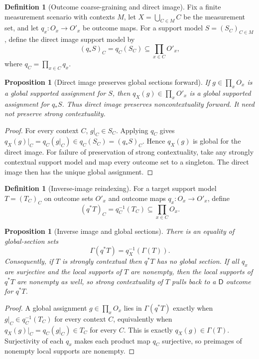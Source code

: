 \documentclass[11pt]{article}
\theoremstyle{plain}
\newtheorem{proposition}[theorem]{Proposition}
\theoremstyle{definition}
\newtheorem{definition}[theorem]{Definition}
\theoremstyle{remark}
\begin{document}
\begin{definition}[Outcome coarse-graining and direct image]
\label{def:empirical-direct-image}
Fix a finite measurement scenario with contexts $M$, let
$X=\bigcup_{C\in M}C$ be the measurement set, and let
$q_x:O_x\to O'_x$ be outcome maps. For a support model $S=(S_C)_{C\in M}$,
define the direct image support model by
\[
(q_*S)_C=q_C(S_C)\subseteq\prod_{x\in C}O'_x,
\]
where $q_C=\prod_{x\in C}q_x$.
\end{definition}

\begin{proposition}[Direct image preserves global sections forward]
\label{prop:empirical-direct-image}
If $g\in\prod_xO_x$ is a global supported assignment for $S$, then
$q_X(g)\in\prod_xO'_x$ is a global supported assignment for $q_*S$. Thus direct
image preserves noncontextuality forward. It need not preserve strong
contextuality.
\end{proposition}

\begin{proof}
For every context $C$, $g|_C\in S_C$. Applying $q_C$ gives
$q_X(g)|_C=q_C(g|_C)\in q_C(S_C)=(q_*S)_C$. Hence $q_X(g)$ is global for the
direct image. For failure of preservation of strong contextuality, take any
strongly contextual support model and map every outcome set to a singleton. The
direct image then has the unique global assignment.
\end{proof}

\begin{definition}[Inverse-image reindexing]
\label{def:empirical-inverse-image}
For a target support model $T=(T_C)_C$ on outcome sets $O'_x$ and outcome maps
$q_x:O_x\to O'_x$, define
\[
(q^*T)_C=q_C^{-1}(T_C)\subseteq\prod_{x\in C}O_x.
\]
\end{definition}

\begin{proposition}[Inverse image and global sections]
\label{prop:empirical-inverse-image}
There is an equality of global-section sets
\[
\Gamma(q^*T)=q_X^{-1}(\Gamma(T)).
\]
Consequently, if $T$ is strongly contextual then $q^*T$ has no global section.
If all $q_x$ are surjective and the local supports of $T$ are nonempty, then the
local supports of $q^*T$ are nonempty as well, so strong contextuality of $T$
pulls back to a $\mathsf D$ outcome for $q^*T$.
\end{proposition}

\begin{proof}
A global assignment $g\in\prod_xO_x$ lies in $\Gamma(q^*T)$ exactly when
$g|_C\in q_C^{-1}(T_C)$ for every context $C$, equivalently when
$q_X(g)|_C=q_C(g|_C)\in T_C$ for every $C$. This is exactly
$q_X(g)\in\Gamma(T)$. Surjectivity of each $q_x$ makes each product map $q_C$
surjective, so preimages of nonempty local supports are nonempty.
\end{proof}
\end{document}
